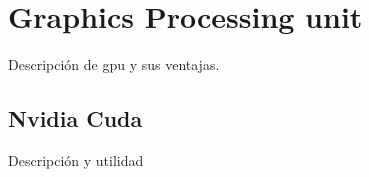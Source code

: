 \section{Graphics Processing unit}
Descripción de gpu y sus ventajas.

\subsection{Nvidia Cuda}
Descripción y utilidad
